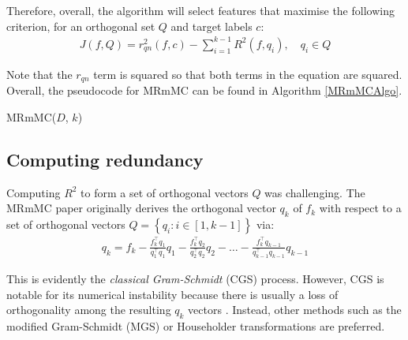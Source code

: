 \documentclass[12pt, twoside, a4paper]{report}
\begin{document}
Therefore, overall, the algorithm will select features that maximise the following criterion, for an orthogonal set $Q$ and target labels $c$:
\begin{align*}
J(f, Q) = r_{qn}^2(f, c)- \sum_{i=1}^{k-1} R^2(f, q_i), \quad q_i \in Q
\end{align*}

Note that the $r_{qn}$ term is squared so that both terms in the equation are squared. Overall, the pseudocode for MRmMC can be found in Algorithm \ref{MRmMCAlgo}.

\begin{algorithm}
\DontPrintSemicolon
{}
\BlankLine
{}
\caption{MRmMC($D$, $k$) \label{MRmMCAlgo}}
\end{algorithm}

\subsection{Computing redundancy}

Computing $R^2$ to form a set of orthogonal vectors $Q$ was challenging. The MRmMC paper \cite{RefWorks:187} originally derives the orthogonal vector $q_k$ of $f_k$ with respect to a set of orthogonal vectors $Q = \left\lbrace q_i: i \in [1, k-1] \right\rbrace$ via:
\begin{align*}
q_k = f_k  - \frac{f_k^\top q_1}{q_1^\top q_1}q_1  - \frac{f_k^\top q_2}{q_2^\top q_2}q_2 - \dots - \frac{f_k^\top q_{k-1}}{q_{k-1}^\top q_{k-1}}q_{k-1}
\end{align*}

This is evidently the \textit{classical Gram-Schmidt} (CGS) process. However, CGS is notable for its numerical instability because there is usually a loss of orthogonality among the resulting $q_k$ vectors \cite{RefWorks:195}. Instead, other methods such as the modified Gram-Schmidt (MGS) or Householder transformations are preferred.
\end{document}
